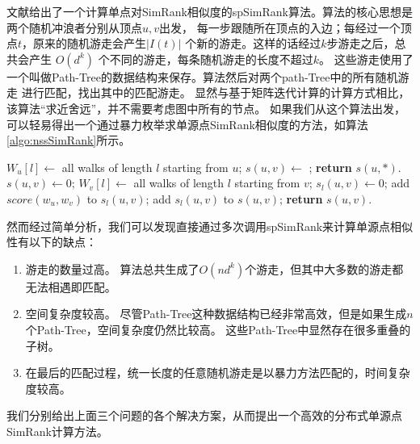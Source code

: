 \documentclass[master]{njuthesis}
\begin{document}
文献\cite{li2010fast}给出了一个计算单点对SimRank相似度的spSimRank算法。算法的核心思想是两个随机冲浪者分别从顶点$u,v$出发，
每一步跟随所在顶点的入边；每经过一个顶点$t$，原来的随机游走会产生$|I(t)|$ 个新的游走。这样的话经过$k$步游走之后，总共会产生
$O(d^k)$ 个不同的游走，每条随机游走的长度不超过$k$。
这些游走使用了一个叫做Path-Tree的数据结构来保存。算法然后对两个path-Tree中的所有随机游走
进行匹配，找出其中的匹配游走。
显然与基于矩阵迭代计算的计算方式相比，该算法“求近舍远”，并不需要考虑图中所有的节点。
如果我们从这个算法出发，可以轻易得出一个通过暴力枚举求单源点SimRank相似度的方法，如算法\ref{algo:nssSimRank}所示。

\begin{algorithm}[h]
\label{algo:nssSimRank}
\begin{algorithmic}[1]
		\State $W_u[l] \gets $ all walks of length $l$ starting from $u$;
	\EndFor
		\State $s(u,v)\gets$  ;
	\EndFor
	\State \textbf{return} $s(u, *)$.
\EndProcedure
{}
\State $s(u, v) \gets 0$;
	\State $W_v[l] \gets $ all walks of length $l$ starting from $v$;
	\State $s_l(u, v) \gets 0$;
			\State add  $score(w_u, w_v)$ to  $s_l(u, v)$;
		\EndIf
		\EndFor
	\EndFor
	\State add $s_l(u, v)$ to $s(u, v)$;
\EndFor
\State \textbf{return} $s(u, v)$.
\EndProcedure
\end{algorithmic}
\end{algorithm}

然而经过简单分析，我们可以发现直接通过多次调用spSimRank来计算单源点相似性有以下的缺点：
\begin{enumerate}
\item 游走的数量过高。 算法总共生成了$O(nd^k)$个游走，但其中大多数的游走都无法相遇即匹配。
\item 空间复杂度较高。 尽管Path-Tree这种数据结构已经非常高效，但是如果生成$n$个Path-Tree，空间复杂度仍然比较高。
这些Path-Tree中显然存在很多重叠的子树。
\item 在最后的匹配过程，统一长度的任意随机游走是以暴力方法匹配的，时间复杂度较高。
\end{enumerate}
我们分别给出上面三个问题的各个解决方案，从而提出一个高效的分布式单源点SimRank计算方法。
\end{document}
